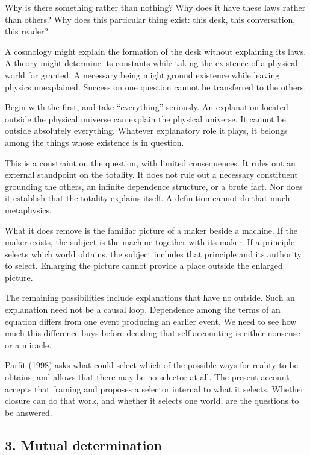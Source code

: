 \documentclass[
  11pt,
]{article}
\begin{document}
Why is there something rather than nothing? Why does it have these laws
rather than others? Why does this particular thing exist: this desk,
this conversation, this reader?

A cosmology might explain the formation of the desk without explaining
its laws. A theory might determine its constants while taking the
existence of a physical world for granted. A necessary being might
ground existence while leaving physics unexplained. Success on one
question cannot be transferred to the others.

Begin with the first, and take ``everything'' seriously. An explanation
located outside the physical universe can explain the physical universe.
It cannot be outside absolutely everything. Whatever explanatory role it
plays, it belongs among the things whose existence is in question.

This is a constraint on the question, with limited consequences. It
rules out an external standpoint on the totality. It does not rule out a
necessary constituent grounding the others, an infinite dependence
structure, or a brute fact. Nor does it establish that the totality
explains itself. A definition cannot do that much metaphysics.

What it does remove is the familiar picture of a maker beside a machine.
If the maker exists, the subject is the machine together with its maker.
If a principle selects which world obtains, the subject includes that
principle and its authority to select. Enlarging the picture cannot
provide a place outside the enlarged picture.

The remaining possibilities include explanations that have no outside.
Such an explanation need not be a causal loop. Dependence among the
terms of an equation differs from one event producing an earlier event.
We need to see how much this difference buys before deciding that
self-accounting is either nonsense or a miracle.

Parfit (1998) asks what could select which of the possible ways for
reality to be obtains, and allows that there may be no selector at all.
The present account accepts that framing and proposes a selector
internal to what it selects. Whether closure can do that work, and
whether it selects one world, are the questions to be answered.

\subsection{3. Mutual determination}\label{mutual-determination}
\end{document}
